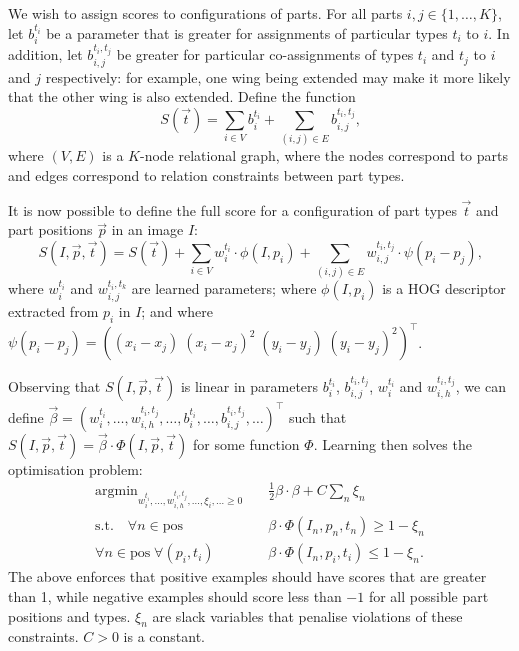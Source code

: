 \documentclass[11pt, oneside]{report}
\DeclareMathOperator*{\argmin}{argmin}
\begin{document}
    We wish to assign scores to configurations of parts. For all parts $i, j \in \{1,\dots,K\}$, let $b_i^{t_i}$ be a parameter that is greater for assignments of particular types $t_i$ to $i$. In addition, let $b_{i,j}^{t_i,t_j}$ be greater for particular co-assignments of types $t_i$ and $t_j$ to $i$ and $j$ respectively: for example, one wing being extended may make it more likely that the other wing is also extended. Define the function   \[
        S(\vec t) = \sum_{i\in V}b_i^{t_i}+\sum_{(i,j)\in E}b_{i,j}^{t_i,t_j}\textrm{,}
    \]
    where $(V,E)$ is a $K$-node relational graph, where the nodes correspond to parts and edges correspond to relation constraints between part types.

    It is now possible to define the full score for a configuration of part types $\vec t$ and part positions $\vec p$ in an image $I$: \[
        S(I,\vec p, \vec t) = S(\vec t) + \sum_{i\in V}w^{t_i}_i\cdot\phi(I,p_i)
        + \sum_{(i,j) \in E}w_{i,j}^{t_i,t_j}\cdot\psi(p_i-p_j)\textrm{,}
    \]
    where $w_i^{t_i}$ and $w_{i,j}^{t_i,t_k}$ are learned parameters; where $\phi(I, p_i)$ is a HOG descriptor extracted from $p_i$ in $I$; and where $\psi(p_i-p_j)=\left((x_i-x_j)\;(x_i-x_j)^2\;(y_i-y_j)\;(y_i-y_j)^2\right)^\intercal$.

    Observing that $S(I,\vec p, \vec t)$ is linear in parameters $b_i^{t_i}$, $b_{i,j}^{t_i,t_j}$, $w_i^{t_i}$ and $w_{i,h}^{t_i,t_j}$, we can define $\vec\beta = \left(w_i^{t_i}, \dots, w_{i,h}^{t_i,t_j}, \dots, b_i^{t_i}, \dots, b_{i,j}^{t_i,t_j}, \dots\right)^\intercal$ such that $S\left(I, \vec p, \vec t\right)=\vec\beta\cdot\Phi\left(I, \vec p, \vec t\right)$ for some function $\Phi$. Learning then solves the optimisation problem: \begin{align*}
        \argmin_{w_i^{t_i}, \dots, w_{i,h}^{t_i,t_j}, \dots, \xi_i, \ldots \geq 0} &\quad\frac12\beta\cdot\beta+C\sum_n\xi_n\\
        \textrm{s.t.}\quad\forall n \in \textrm{pos} & \quad\beta\cdot\Phi(I_n, p_n, t_n) \geq 1-\xi_n \\
        \forall n \in \textrm{pos} \;\forall (p_i, t_i) & \quad\beta\cdot\Phi(I_n, p_i, t_i) \leq 1-\xi_n\textrm{.}
    \end{align*}
    The above enforces that positive examples should have scores that are greater than 1, while negative examples should score less than $-1$ for all possible part positions and types. $\xi_n$ are slack variables that penalise violations of these constraints. $C>0$ is a constant.
\end{document}
